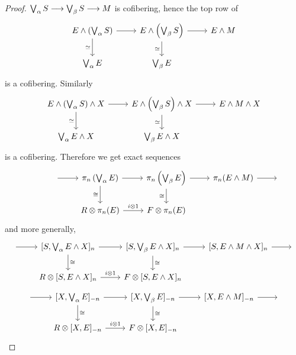 \documentclass[../main]{subfiles}
\begin{document}
\begin{proof}
$\bigvee_\alpha S\longrightarrow \bigvee_\beta S\longrightarrow M$ is cofibering, hence the top row of
\[\begin{tikzcd}
	{E\wedge\left( \bigvee_\alpha S\right)} & {E\wedge\left( \bigvee_\beta S\right)} & {E\wedge M} \\
	{\bigvee_\alpha E} & {\bigvee_\beta E}
	\arrow[from=1-1, to=1-2]
	\arrow[from=1-2, to=1-3]
	\arrow["\simeq"', from=1-2, to=2-2]
	\arrow["\simeq"', from=1-1, to=2-1]
\end{tikzcd}\]
is a cofibering. Similarly
\[\begin{tikzcd}
	{E\wedge\left( \bigvee_\alpha S\right)\wedge X} & {E\wedge\left( \bigvee_\beta S\right)\wedge X} & {E\wedge M \wedge X} \\
	{\bigvee_\alpha E \wedge X} & {\bigvee_\beta E \wedge X}
	\arrow[from=1-1, to=1-2]
	\arrow[from=1-2, to=1-3]
	\arrow["\simeq"', from=1-2, to=2-2]
	\arrow["\simeq"', from=1-1, to=2-1]
\end{tikzcd}\]
is a cofibering. Therefore we get exact sequences
\[\begin{tikzcd}
	{} & {} & {\pi_n\left( \bigvee_\alpha E \right)} & {\pi_n \left( \bigvee_\beta E \right)} & {\pi_n(E\wedge M)} & {} \\
	&& {R\otimes \pi_n(E)} & {F\otimes \pi_n(E)}
	\arrow[from=1-4, to=1-5]
	\arrow[from=1-5, to=1-6]
	\arrow["\cong"', from=1-4, to=2-4]
	\arrow[from=1-3, to=1-4]
	\arrow["{i\otimes 1}", from=2-3, to=2-4]
	\arrow["\cong"', from=1-3, to=2-3]
	\arrow[from=1-2, to=1-3]
\end{tikzcd}\]
and more generally,
\[\begin{tikzcd}
	{} & {[S, \bigvee_\alpha E\wedge X]_n} & {[S, \bigvee_\beta E\wedge X]_n} & {[S, E\wedge M\wedge X]_n} & {} \\
	& {R\otimes [S, E\wedge X]_n} & {F\otimes [S, E\wedge X]_n}
	\arrow[from=1-1, to=1-2]
	\arrow[from=1-2, to=1-3]
	\arrow[from=1-3, to=1-4]
	\arrow[from=1-4, to=1-5]
	\arrow["\cong", from=1-2, to=2-2]
	\arrow["\cong", from=1-3, to=2-3]
	\arrow["{i\otimes 1}", from=2-2, to=2-3]
\end{tikzcd}\]
\[\begin{tikzcd}
	{} & {[X, \bigvee_\alpha E]_{-n}} & {[X, \bigvee_\beta E]_{-n}} & {[X, E\wedge M]_{-n}} & {} \\
	& {R\otimes [X, E]_{-n}} & {F\otimes [X, E]_{-n}}
	\arrow[from=1-1, to=1-2]
	\arrow[from=1-2, to=1-3]
	\arrow[from=1-3, to=1-4]
	\arrow[from=1-4, to=1-5]
	\arrow["\cong", from=1-2, to=2-2]
	\arrow["\cong", from=1-3, to=2-3]
	\arrow["{i\otimes 1}", from=2-2, to=2-3]
\end{tikzcd}\]


\end{proof}
\end{document}

